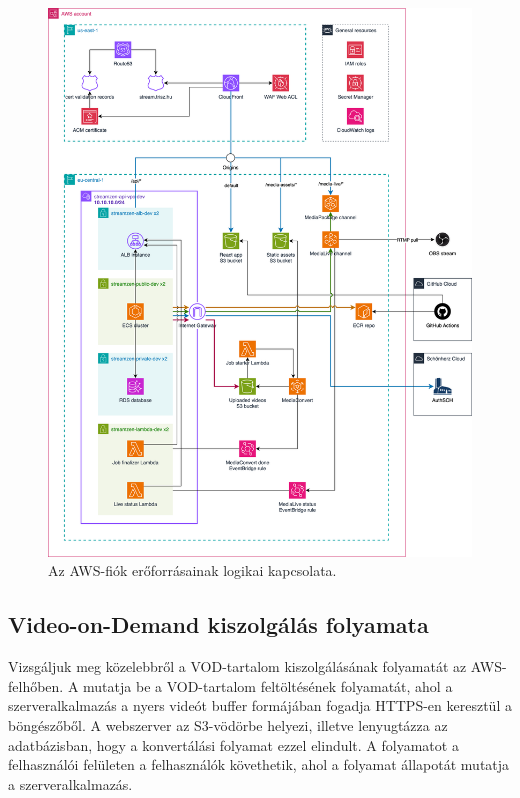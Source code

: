 \vspace{2cm} %

\begin{figure}[!ht]
	\centering
	\includegraphics[width=160mm, keepaspectratio]{figures/dipterv_architect.png}
	\caption{Az AWS-fiók erőforrásainak logikai kapcsolata.}
	\label{fig:architect}
\end{figure}

\vspace{2cm} %

\subsection{Video-on-Demand kiszolgálás folyamata}

Vizsgáljuk meg közelebbről a VOD-tartalom kiszolgálásának folyamatát az AWS-felhőben. A  mutatja be a VOD-tartalom feltöltésének folyamatát, ahol a szerveralkalmazás a nyers videót buffer formájában fogadja HTTPS-en keresztül a böngészőből. A webszerver az S3-vödörbe helyezi, illetve lenyugtázza az adatbázisban, hogy a konvertálási folyamat ezzel elindult. A folyamatot a felhasználói felületen a felhasználók követhetik, ahol a folyamat állapotát mutatja a szerveralkalmazás.

